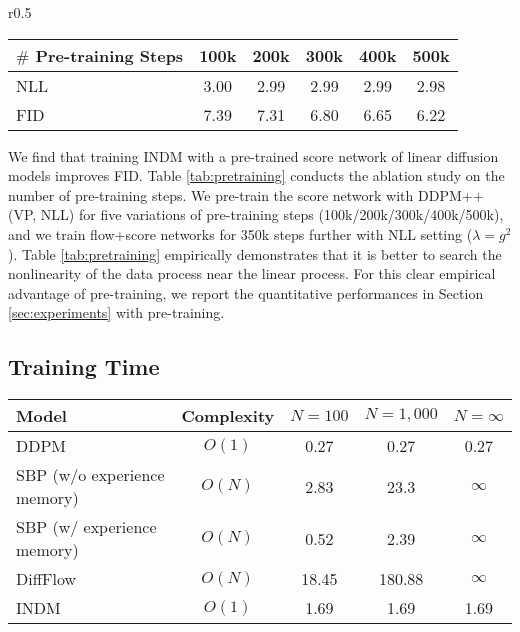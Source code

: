 \documentclass{article}
\theoremstyle{definition}
\theoremstyle{remark}
\begin{document}
	\begin{wraptable}{r}{0.5\textwidth}
		\vskip -0.38in
		\caption{Ablation study on pre-training.}
		\label{tab:pretraining}
		\scriptsize
		\centering
		\begin{tabular}{lccccc}
			\toprule
			$\#$ Pre-training Steps & 100k & 200k & 300k & 400k & 500k\\\midrule
			NLL & 3.00 & 2.99 & 2.99 & 2.99 & 2.98 \\
			FID & 7.39 & 7.31 & 6.80 & 6.65 & 6.22 \\
			\bottomrule
		\end{tabular}
		\vskip -0.23in
	\end{wraptable}
	We find that training INDM with a pre-trained score network of linear diffusion models improves FID. Table \ref{tab:pretraining} conducts the ablation study on the number of pre-training steps. We pre-train the score network with DDPM++ (VP, NLL) for five variations of pre-training steps (100k/200k/300k/400k/500k), and we train flow+score networks for 350k steps further with NLL setting ($\lambda=g^{2}$). Table \ref{tab:pretraining} empirically demonstrates that it is better to search the nonlinearity of the data process near the linear process. For this clear empirical advantage of pre-training, we report the quantitative performances in Section \ref{sec:experiments} with pre-training.
	
	\subsection{Training Time}\label{appendix:training_time}
	
	\begin{table*}[t]
		\caption{Elapsed time per a training step by discretization.}
		\label{tab:elapsed_time}
		\scriptsize
		\centering
		\begin{tabular}{lcccc}
			\toprule
			Model & Complexity & $N=100$ & $N=1,000$ & $N=\infty$ \\\midrule
			DDPM & $O(1)$ & 0.27 & 0.27 & 0.27 \\
			SBP (w/o experience memory) & $O(N)$ & 2.83 & 23.3 & $\infty$ \\
			SBP (w/ experience memory) & $O(N)$ & 0.52 & 2.39 & $\infty$ \\
			DiffFlow & $O(N)$ & 18.45 & 180.88 & $\infty$ \\
			INDM & $O(1)$ & 1.69 & 1.69 & 1.69 \\
			\bottomrule
		\end{tabular}
	\end{table*}
	
\end{document}
